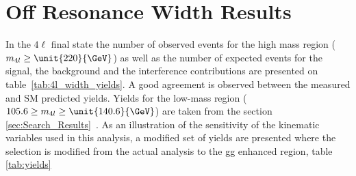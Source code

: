 \section{Off Resonance Width Results}
\label{sec:Width_Results}

In the $4\ell$ final state the number of observed events for the high mass region ($m_{4l} \ge \unit{220}{\GeV}$) as well as the number of expected events for the signal, the background and the interference contributions are presented on table~\ref{tab:4l_width_yields}. A good agreement is observed between the measured and SM predicted yields. Yields for the low-mass region ($105.6 \ge m_{4l} \ge \unit{140.6}{\GeV}$) are taken from the section \ref{sec:Search_Results}~\cite{Chatrchyan:2013mxa}. As an illustration of the sensitivity of the kinematic variables used in this analysis, a modified set of yields are presented where the selection is modified from the actual analysis to the gg enhanced region, table \ref{tab:yields}

